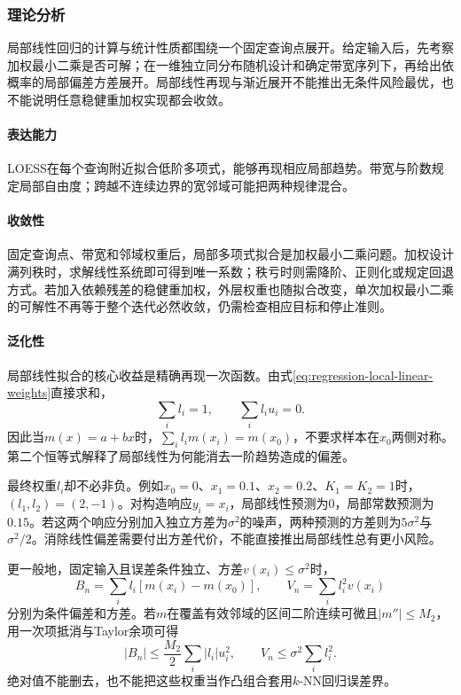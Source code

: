 \subsubsection{理论分析}
\label{sec:regression-loess-theory}

局部线性回归的计算与统计性质都围绕一个固定查询点展开。给定输入后，先考察加权最小二乘是否可解；在一维独立同分布随机设计和确定带宽序列下，再给出依概率的局部偏差方差展开。局部线性再现与渐近展开不能推出无条件风险最优，也不能说明任意稳健重加权实现都会收敛。

\paragraph{表达能力}
LOESS在每个查询附近拟合低阶多项式，能够再现相应局部趋势。带宽与阶数规定局部自由度；跨越不连续边界的宽邻域可能把两种规律混合。

\paragraph{收敛性}
固定查询点、带宽和邻域权重后，局部多项式拟合是加权最小二乘问题。加权设计满列秩时，求解线性系统即可得到唯一系数；秩亏时则需降阶、正则化或规定回退方式。若加入依赖残差的稳健重加权，外层权重也随拟合改变，单次加权最小二乘的可解性不再等于整个迭代必然收敛，仍需检查相应目标和停止准则。

\paragraph{泛化性}
局部线性拟合的核心收益是精确再现一次函数。由式\eqref{eq:regression-local-linear-weights}直接求和，
\[
  \sum_i l_i=1,\qquad \sum_i l_i u_i=0.
\]
因此当$m(x)=a+bx$时，$\sum_i l_i m(x_i)=m(x_0)$，不要求样本在$x_0$两侧对称。第二个恒等式解释了局部线性为何能消去一阶趋势造成的偏差。

最终权重$l_i$却不必非负。例如$x_0=0$、$x_1=0.1$、$x_2=0.2$、$K_1=K_2=1$时，$(l_1,l_2)=(2,-1)$。对构造响应$y_i=x_i$，局部线性预测为$0$，局部常数预测为$0.15$。若这两个响应分别加入独立方差为$\sigma^2$的噪声，两种预测的方差则为$5\sigma^2$与$\sigma^2/2$。消除线性偏差需要付出方差代价，不能直接推出局部线性总有更小风险。

更一般地，固定输入且误差条件独立、方差$v(x_i)\leq\sigma^2$时，
\[
  B_n=\sum_i l_i[m(x_i)-m(x_0)],\qquad
  V_n=\sum_i l_i^2v(x_i)
\]
分别为条件偏差和方差。若$m$在覆盖有效邻域的区间二阶连续可微且$|m''|\leq M_2$，用一次项抵消与Taylor余项可得
\[
  |B_n|\leq\frac{M_2}{2}\sum_i|l_i|u_i^2,\qquad
  V_n\leq\sigma^2\sum_i l_i^2.
\]
绝对值不能删去，也不能把这些权重当作凸组合套用$k$-NN回归误差界。

